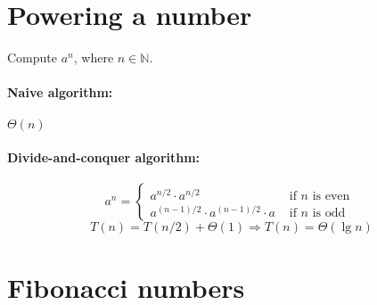 \documentclass[11pt,toc=twocol]{elegantbook}
\begin{document}
\section{Powering a number}

\begin{problem}
    Compute $a^{n}$, where $n \in \mathbb{N}$.
\end{problem}
\begin{solution}
    \paragraph*{Naive algorithm:}
        $\Theta(n)$
    \paragraph*{Divide-and-conquer algorithm:}
    $$
    a^{n}= \begin{cases}a^{n / 2} \cdot a^{n / 2} & \text { if } n \text { is even } \\ a^{(n-1) / 2} \cdot a^{(n-1) / 2} \cdot a & \text { if } n \text { is odd }\end{cases}
    $$
    $$
    T(n)=T(n / 2)+\Theta(1) \Rightarrow T(n)=\Theta(\lg n)
    $$
\end{solution}
\section{Fibonacci numbers}
\end{document}
